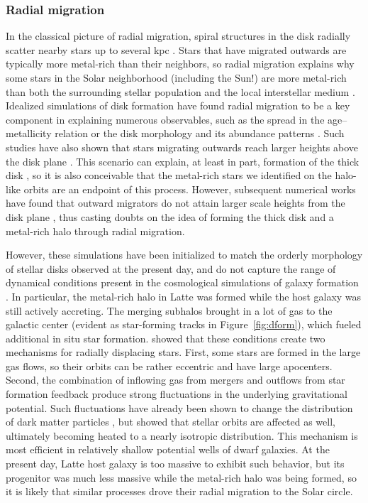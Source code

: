 \documentclass[apj, twocolappendix, numberedappendix, appendixfloats]{emulateapj}
\begin{document}
\subsubsection{Radial migration}
\label{sec:migration}
In the classical picture of radial migration, spiral structures in the disk radially scatter nearby stars up to several kpc \citep{sellwood2002}.
Stars that have migrated outwards are typically more metal-rich than their neighbors, so radial migration explains why some stars in the Solar neighborhood (including the Sun!) are more metal-rich than both the surrounding stellar population and the local interstellar medium \citep{wielen1996}.
Idealized simulations of disk formation have found radial migration to be a key component in explaining numerous observables, such as the spread in the age--metallicity relation \citep{roskar2008} or the disk morphology and its abundance patterns \citep{schonrich2009}.
Such studies have also shown that stars migrating outwards reach larger heights above the disk plane \citep[e.g.,][]{schonrich2009, loebman2011}.
This scenario can explain, at least in part, formation of the thick disk \citep[e.g.,][]{wilson2011}, so it is also conceivable that the metal-rich stars we identified on the halo-like orbits are an endpoint of this process.
However, subsequent numerical works have found that outward migrators do not attain larger scale heights from the disk plane \citep{minchev2012, vera-ciro2014}, thus casting doubts on the idea of forming the thick disk and a metal-rich halo through radial migration.

However, these simulations have been initialized to match the orderly morphology of stellar disks observed at the present day, and do not capture the range of dynamical conditions present in the cosmological simulations of galaxy formation \citep[e.g.,][]{agertz2009}.
In particular, the metal-rich halo in Latte was formed while the host galaxy was still actively accreting.
The merging subhalos brought in a lot of gas to the galactic center (evident as star-forming tracks in Figure~\ref{fig:dform}), which fueled additional in situ star formation.
\citet{elbadry2016} showed that these conditions create two mechanisms for radially displacing stars.
First, some stars are formed in the large gas flows, so their orbits can be rather eccentric and have large apocenters.
Second, the combination of inflowing gas from mergers and outflows from star formation feedback produce strong fluctuations in the underlying gravitational potential.
Such fluctuations have already been shown to change the distribution of dark matter particles \citep[e.g.,][]{pontzen2012, brooks2014, dicintio2014}, but \citet{elbadry2016} showed that stellar orbits are affected as well, ultimately becoming heated to a nearly isotropic distribution.
This mechanism is most efficient in relatively shallow potential wells of dwarf galaxies.
At the present day, Latte host galaxy is too massive to exhibit such behavior, but its progenitor was much less massive while the metal-rich halo was being formed, so it is likely that similar processes drove their radial migration to the Solar circle.
\end{document}
